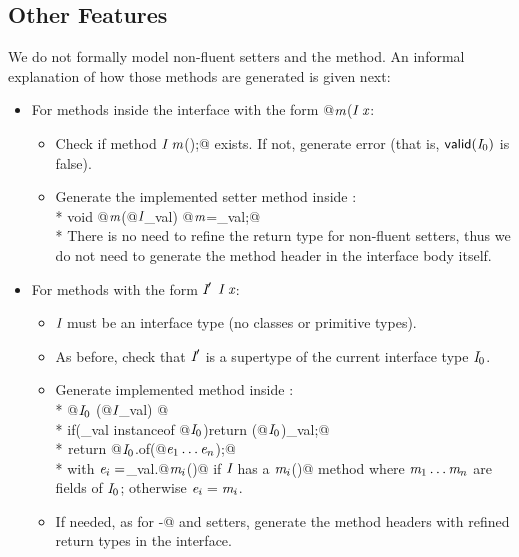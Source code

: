 \subsection{Other Features}\label{subsec:otherfeatures}

We do not formally model non-fluent setters and the \Q@with@ method.
An informal explanation of how those methods are generated is given next:
\begin{itemize}
\item For methods inside the interface with the form \Q@void @$\textit{m}$\QM($\C\ \x$\QM{);}:
  \begin{itemize}
    \item Check if method $\textit{I}\ \textit{m}$\Q@();@ exists. If not, generate error (that
      is, $\textsf{valid}(\textit{I}_0)$ is false).
    \item Generate the implemented setter method inside \Q@of@:\\*
      \Q@public void @$\textit{m}$\Q@(@$\textit{I}$\Q@ _val) { @$\textit{m}$\Q@=_val;}@\\*
      There is no need to refine the return type for non-fluent setters, thus we
      do not need to generate the method header in the interface body itself.
    \end{itemize}
\item For methods with the form $\C'\ $$\C\ \x$\QM{);}:
  \begin{itemize}
   \item $\textit{I}$ must be an interface type (no classes or primitive types).
    \item As before, check that $\textit{I}'$ is a supertype of the current interface type $\textit{I}_0$.
    \item Generate implemented \Q@with@ method inside \Q@of@:\\*
           \Q@public @$\textit{I}_0\ $\Q@with(@$\textit{I}$\Q@ _val) { @\\*
           \Q@  if(_val instanceof @$\textit{I}_0$\Q@){return (@$\textit{I}_0$\Q@)_val;}@\\*
${}_{}$\Q@  return @$\textit{I}_0$\Q@.of(@$\textit{e}_1\ldots\textit{e}_n$\Q@);}@\\*
 with $\textit{e}_i=$\Q@_val.@$\textit{m}_i$\Q@()@ if $\textit{I}$ has a $\textit{m}_i$\Q@()@ method where
 $\textit{m}_1\ldots\textit{m}_n$ are fields of $\textit{I}_0$; otherwise $\textit{e}_i=\textit{m}_i$.
    \item If needed, as for \Q@with-@ and setters, generate the method headers with refined return types in the interface.
 \end{itemize}


\end{itemize}
